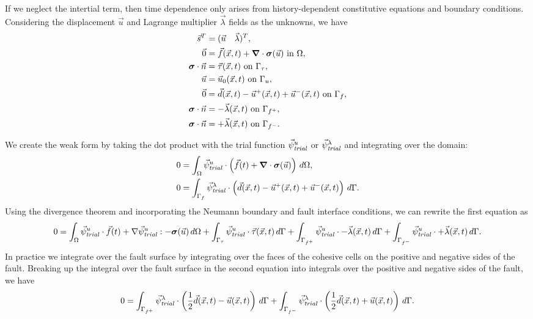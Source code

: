 If we neglect the intertial term, then time dependence only arises
from history-dependent constitutive equations and boundary conditions. Considering the
displacement $\vec{u}$ and Lagrange multiplier $\vec{\lambda}$ fields as the unknowns, we have
\begin{align}
  \vec{s}^T &= (\vec{u} \quad \vec{\lambda})^T, \\
%
  \vec{0} &= \vec{f}(\vec{x},t) + \tensor{\nabla} \cdot \tensor{\sigma}(\vec{u}) \text{ in }
\Omega, \\
  \tensor{\sigma} \cdot \vec{n} &= \vec{\tau}(\vec{x},t) \text{ on }\Gamma_\tau, \\
  \vec{u} &= \vec{u}_0(\vec{x},t) \text{ on }\Gamma_u, \\
  \vec{0} &= \vec{d}(\vec{x},t) - \vec{u}^+(\vec{x},t) + \vec{u}^-(\vec{x},t) \text{ on }\Gamma_f, \\
  \tensor{\sigma} \cdot \vec{n} &= -\vec{\lambda}(\vec{x},t) \text{ on }\Gamma_{f^+}, \\
  \tensor{\sigma} \cdot \vec{n} &= +\vec{\lambda}(\vec{x},t) \text{ on }\Gamma_{f^-}.
\end{align}

We create the weak form by taking the dot product with the trial
function $\trialvec[u]$ or $\trialvec[\lambda]$ and integrating over the domain:
\begin{align}
  0 &= \int_\Omega \trialvec[u] \cdot \left( \vec{f}(t) + \tensor{\nabla} \cdot \tensor{\sigma} (\vec{u}) \right) \, d\Omega, \\
  0 &= \int_{\Gamma_f} \trialvec[\lambda] \cdot \left( \vec{d}(\vec{x},t) - \vec{u}^+(\vec{x},t) + \vec{u}^-(\vec{x},t) \right) \, d\Gamma.
\end{align}
Using the divergence theorem and incorporating the Neumann boundary and fault interface
conditions, we can rewrite the first equation as
\begin{equation}
  0 = \int_\Omega \trialvec[u] \cdot \vec{f}(t) + \nabla \trialvec[u] : -\tensor{\sigma}
  (\vec{u}) \, d\Omega
  + \int_{\Gamma_\tau} \trialvec[u] \cdot \vec{\tau}(\vec{x},t) \, d\Gamma
  + \int_{\Gamma_{f^+}} \trialvec[u] \cdot -\vec{\lambda}(\vec{x},t) \, d\Gamma
  + \int_{\Gamma_{f^-}} \trialvec[u] \cdot +\vec{\lambda}(\vec{x},t) \, d\Gamma. \\
\end{equation}
In practice we integrate over the fault surface by integrating over
the faces of the cohesive cells on the positive and negative sides of
the fault. Breaking up the integral over the fault surface in the
second equation into integrals over the positive and negative sides of
the fault, we have
\begin{equation}
  0 = \int_{\Gamma_{f^+}} \trialvec[\lambda] \cdot \left( \frac{1}{2}\vec{d}(\vec{x},t) - \vec{u}(\vec{x},t) \right) \, d\Gamma
    + \int_{\Gamma_{f^-}} \trialvec[\lambda] \cdot \left( \frac{1}{2}\vec{d}(\vec{x},t) + \vec{u}(\vec{x},t) \right) \, d\Gamma.
  \end{equation}


